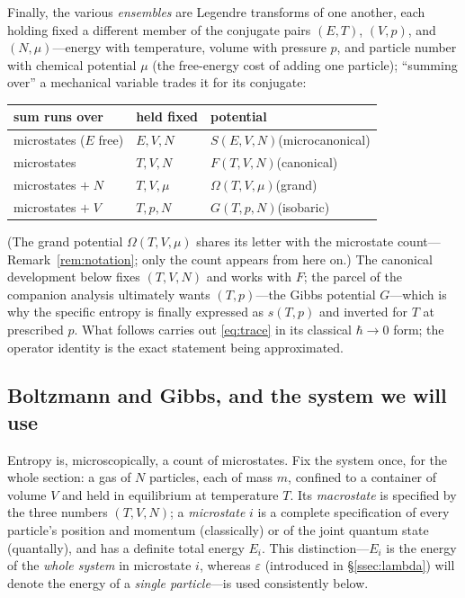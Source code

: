 \documentclass[11pt,a4paper]{article}
\theoremstyle{definition}
\begin{document}
Finally, the various \emph{ensembles} are Legendre transforms of one another,
each holding fixed a different member of the conjugate pairs $(E,T)$, $(V,p)$,
and $(N,\mu)$---energy with temperature, volume with pressure $p$, and particle
number with chemical potential $\mu$ (the free-energy cost of adding one
particle); ``summing over'' a mechanical variable trades it for its conjugate:
\begin{center}
\small
\begin{tabular}{lll}
\toprule
sum runs over & held fixed & potential\\
\midrule
microstates ($E$ free) & $E,V,N$ & $S(E,V,N)$\quad(microcanonical)\\
microstates & $T,V,N$ & $F(T,V,N)$\quad(canonical)\\
microstates $+\;N$ & $T,V,\mu$ & $\Omega(T,V,\mu)$\quad(grand)\\
microstates $+\;V$ & $T,p,N$ & $G(T,p,N)$\quad(isobaric)\\
\bottomrule
\end{tabular}
\end{center}
(The grand potential $\Omega(T,V,\mu)$ shares its letter with the microstate
count---Remark~\ref{rem:notation}; only the count appears from here on.)
The canonical development below fixes $(T,V,N)$ and works with $F$; the parcel
of the companion analysis ultimately wants $(T,p)$---the Gibbs potential
$G$---which is why the specific entropy is finally expressed as $s(T,p)$ and
inverted for $T$ at prescribed $p$. What follows carries out \eqref{eq:trace} in
its classical $\hbar\to0$ form; the operator identity is the exact statement
being approximated.

\subsection{Boltzmann and Gibbs, and the system we will use}\label{ssec:BG}

Entropy is, microscopically, a count of microstates. Fix the system once, for
the whole section: a gas of $N$ particles, each of mass $m$, confined to a
container of volume $V$ and held in equilibrium at temperature $T$. Its
\emph{macrostate} is specified by the three numbers $(T,V,N)$; a
\emph{microstate} $i$ is a complete specification of every particle's position
and momentum (classically) or of the joint quantum state (quantally), and has a
definite total energy $E_i$. This distinction---$E_i$ is the energy of the
\emph{whole system} in microstate $i$, whereas $\varepsilon$ (introduced in
\S\ref{ssec:lambda}) will denote the energy of a \emph{single particle}---is
used consistently below.
\end{document}
